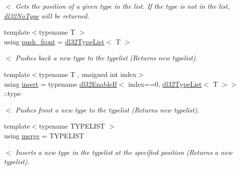 \begin{DoxyCompactItemize}
\begin{DoxyCompactList}\small\item\em $<$ Gets the position of a given type in the list. If the type is not in the list, \hyperlink{classdl32_no_type}{dl32\-No\-Type} will be returned. \end{DoxyCompactList}\item 
\hypertarget{structdl32_type_list_3_4_a20a32d66d4e904bdda50e6eabe1a880a}{{\footnotesize template$<$typename T $>$ }\\using \hyperlink{structdl32_type_list_3_4_a20a32d66d4e904bdda50e6eabe1a880a}{push\-\_\-front} = \hyperlink{structdl32_type_list}{dl32\-Type\-List}$<$ T $>$}\label{structdl32_type_list_3_4_a20a32d66d4e904bdda50e6eabe1a880a}

\begin{DoxyCompactList}\small\item\em $<$ Pushes back a new type to the typelist (Returns new typelist). \end{DoxyCompactList}\item 
\hypertarget{structdl32_type_list_3_4_a8154acb5918116d4ce4cf28f47b01ea4}{{\footnotesize template$<$typename T , unsigned int index$>$ }\\using \hyperlink{structdl32_type_list_3_4_a8154acb5918116d4ce4cf28f47b01ea4}{insert} = typename \hyperlink{structdl32_enable_if}{dl32\-Enable\-If}$<$ index==0, \hyperlink{structdl32_type_list}{dl32\-Type\-List}$<$ T $>$$>$\-::type}\label{structdl32_type_list_3_4_a8154acb5918116d4ce4cf28f47b01ea4}

\begin{DoxyCompactList}\small\item\em $<$ Pushes front a new type to the typelist (Returns new typelist). \end{DoxyCompactList}\item 
\hypertarget{structdl32_type_list_3_4_ac367c908cfcac14aa7cb54691218d1da}{{\footnotesize template$<$typename T\-Y\-P\-E\-L\-I\-S\-T $>$ }\\using \hyperlink{structdl32_type_list_3_4_ac367c908cfcac14aa7cb54691218d1da}{merge} = T\-Y\-P\-E\-L\-I\-S\-T}\label{structdl32_type_list_3_4_ac367c908cfcac14aa7cb54691218d1da}

\begin{DoxyCompactList}\small\item\em $<$ Inserts a new type in the typelist at the specified position (Returns a new typelist). \end{DoxyCompactList}\end{DoxyCompactItemize}


